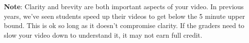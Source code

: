 {\bf Note}: Clarity and brevity are both important aspects of your video.  In previous years, we've seen 
students speed up their videos to get below the 5 minute upper bound. This is ok so long as it doesn't 
compromise clarity. If the graders need to slow your video down to understand
it, it may not earn full credit.



\newpage


